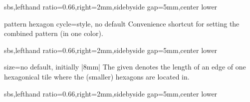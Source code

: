 \documentclass[a4paper,11pt]{article}
\begin{document}
\begin{myvoid}
\begin{dispExample*}{sbs,lefthand ratio=0.66,right=2mm,sidebyside gap=5mm,center lower}
\end{dispExample*}

\begin{docTikzKey}{pattern hexagon cycle}{=}{style, no default}
  Convenience shortcut for setting the combined pattern (in one color).

\begin{dispExample*}{sbs,lefthand ratio=0.66,right=2mm,sidebyside gap=5mm,center lower}
\end{dispExample*}
\end{docTikzKey}

\clearpage

\begin{docPatternKey}[][doc label=size@hexcycle]{size}{=}{no default, initially |8mm|}
  The given  denotes the length of an edge of one hexagonical tile
  where the (smaller) hexagons are located in.
\begin{dispExample*}{sbs,lefthand ratio=0.66,right=2mm,sidebyside gap=5mm,center lower}
\end{dispExample*}
\end{docPatternKey}



\end{myvoid}
\end{document}
